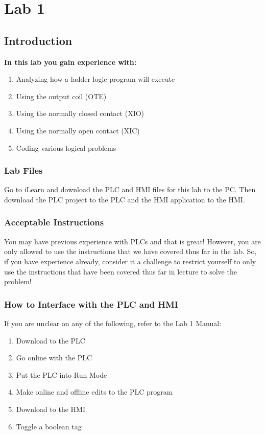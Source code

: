 \chapter{Lab 1}
\setcounter{TASignatures}{0}
\setcounter{AsideCounter}{0}

\section{Introduction}
    \vspace{0.1em}

    \textbf{In this lab you gain experience with:}
    \begin{enumerate}
        \item Analyzing how a ladder logic program will execute
        \item Using the output coil (OTE)
        \item Using the normally closed contact (XIO)
        \item Using the normally open contact (XIC)
        \item Coding various logical problems
    \end{enumerate}

\subsection{Lab Files}

Go to iLearn and download the PLC and HMI files for this lab to the PC. Then download the PLC project to the PLC and the HMI application to the HMI. 

\subsection{Acceptable Instructions}

You may have previous experience with PLCs and that is great! However, you are only allowed to use the instructions that we have covered thus far in the lab. So, if you have experience already, consider it a challenge to restrict yourself to only use the instructions that have been covered thus far in lecture to solve the problem!

\subsection{How to Interface with the PLC and HMI}
\begin{samepage}
\noindent If you are unclear on any of the following, refer to the Lab 1 Manual:
\begin{enumerate}
    \item Download to the PLC
    \item Go online with the PLC
    \item Put the PLC into Run Mode
    \item Make online and offline edits to the PLC program
    \item Download to the HMI
    \item Toggle a boolean tag
\end{enumerate}

\end{samepage}

